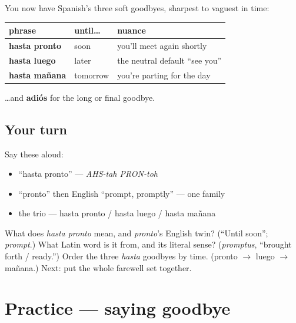 \begin{grammarlens}[title={Grammar Lens: the \textquotedblleft{}hasta …\textquotedblright{} trio, complete}]
You now have Spanish's three soft goodbyes, sharpest to vaguest in time:

\noindent
\begin{tabularx}{\linewidth}{@{}>{\raggedright\arraybackslash}X>{\raggedright\arraybackslash}X>{\raggedright\arraybackslash}X@{}}
\toprule
\textbf{phrase} & \textbf{until…} & \textbf{nuance} \\
\midrule
\textbf{hasta pronto} & soon & you'll meet again shortly \\
\textbf{hasta luego} & later & the neutral default \textquotedblleft{}see you\textquotedblright{} \\
\textbf{hasta mañana} & tomorrow & you're parting for the day \\
\bottomrule
\end{tabularx}

…and \textbf{adiós} for the long or final goodbye.
\end{grammarlens}

\subsection*{Your turn}
Say these aloud:

\begin{itemize}
\raggedright
  \item \textquotedblleft{}hasta pronto\textquotedblright{} — \emph{AHS-tah PRON-toh}
  \item \textquotedblleft{}pronto\textquotedblright{} then English \textquotedblleft{}prompt, promptly\textquotedblright{} — one family
  \item the trio — hasta pronto / hasta luego / hasta mañana
\end{itemize}

\begin{tcolorbox}[breakable,colback=teal!4,colframe=teal!35!black,title={Before you move on}]
What does \emph{hasta pronto} mean, and \emph{pronto}'s English twin? (\textquotedblleft{}Until soon\textquotedblright{}; \emph{prompt}.) What Latin word is it from, and its literal sense? (\emph{promptus}, \textquotedblleft{}brought forth / ready.\textquotedblright{}) Order the three \emph{hasta} goodbyes by time. (pronto $\to$ luego $\to$ mañana.) Next: put the whole farewell set together.
\end{tcolorbox}
\section[Practice]{Practice — saying goodbye}


